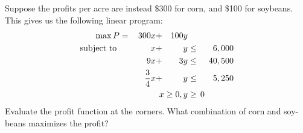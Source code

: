 \documentclass[../mathNotesPreamble]{subfiles}
\begin{document}
  \begin{ex*}
    Suppose the profits per acre are instead \$300 for corn, and \$100 for soybeans. This gives us the following linear program:
      \begin{alignat*}{4}
        \max P&=&\,300x&+&100y\\
        \textnormal{subject to }&& x&+&y&\leq& 6,000\\
          &&9x&+&3y&\leq &\,40,500\\
          &&\frac{3}{4}x&+&y&\leq& 5,250\\
          &&&&\mathllap{x\geq 0}, y&\geq\mathrlap{\,0}&
      \end{alignat*}
    Evaluate the profit function at the corners. What combination of corn and soy-beans maximizes the profit?
  \end{ex*}
\end{document}
